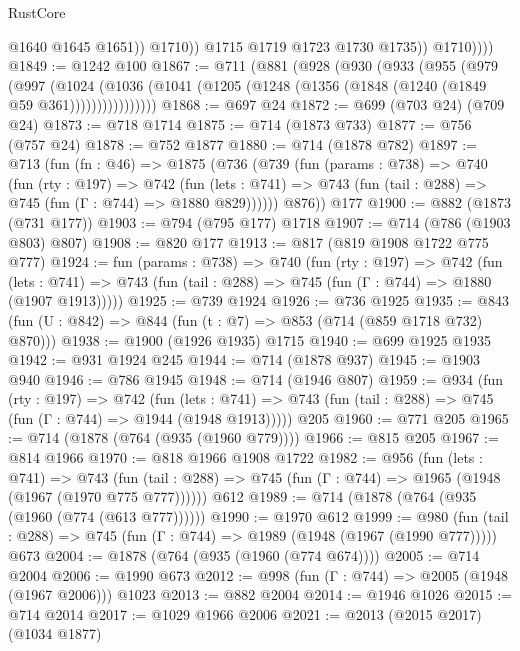 \begin{lexlean}{RustCore}
\begin{coremodule}
                        @1640
                        @1645
                        @1651))
                    @1710))
                @1715
                @1719
                @1723
                @1730
                @1735))
            @1710))))
@1849 := @1242 @100
@1867 := @711
    (@881
      (@928
        (@930
          (@933
            (@955
              (@979
                (@997
                  (@1024
                    (@1036 (@1041 (@1205 (@1248 (@1356 (@1848 (@1240 (@1849 @59 @361))))))))))))))))
@1868 := @697 @24
@1872 := @699 (@703 @24) (@709 @24)
@1873 := @718 @1714
@1875 := @714 (@1873 @733)
@1877 := @756 (@757 @24)
@1878 := @752 @1877
@1880 := @714 (@1878 @782)
@1897 := @713
    (fun (fn : @46) =>
    @1875
      (@736
        (@739
          (fun (params : @738) =>
          @740
            (fun (rty : @197) =>
            @742
              (fun (lets : @741) =>
              @743 (fun (tail : @288) => @745 (fun (Γ : @744) => @1880 @829))))))
        @876))
    @177
@1900 := @882 (@1873 (@731 @177))
@1903 := @794 (@795 @177) @1718
@1907 := @714 (@786 (@1903 @803) @807)
@1908 := @820 @177
@1913 := @817 (@819 @1908 @1722 @775 @777)
@1924 := fun (params : @738) =>
  @740
    (fun (rty : @197) =>
    @742
      (fun (lets : @741) =>
      @743 (fun (tail : @288) => @745 (fun (Γ : @744) => @1880 (@1907 @1913)))))
@1925 := @739 @1924
@1926 := @736 @1925
@1935 := @843 (fun (U : @842) => @844 (fun (t : @7) => @853 (@714 (@859 @1718 @732) @870)))
@1938 := @1900 (@1926 @1935) @1715
@1940 := @699 @1925 @1935
@1942 := @931 @1924 @245
@1944 := @714 (@1878 @937)
@1945 := @1903 @940
@1946 := @786 @1945
@1948 := @714 (@1946 @807)
@1959 := @934
    (fun (rty : @197) =>
    @742
      (fun (lets : @741) =>
      @743 (fun (tail : @288) => @745 (fun (Γ : @744) => @1944 (@1948 @1913)))))
    @205
@1960 := @771 @205
@1965 := @714 (@1878 (@764 (@935 (@1960 @779))))
@1966 := @815 @205
@1967 := @814 @1966
@1970 := @818 @1966 @1908 @1722
@1982 := @956
    (fun (lets : @741) =>
    @743 (fun (tail : @288) => @745 (fun (Γ : @744) => @1965 (@1948 (@1967 (@1970 @775 @777))))))
    @612
@1989 := @714 (@1878 (@764 (@935 (@1960 (@774 (@613 @777))))))
@1990 := @1970 @612
@1999 := @980
    (fun (tail : @288) => @745 (fun (Γ : @744) => @1989 (@1948 (@1967 (@1990 @777)))))
    @673
@2004 := @1878 (@764 (@935 (@1960 (@774 @674))))
@2005 := @714 @2004
@2006 := @1990 @673
@2012 := @998 (fun (Γ : @744) => @2005 (@1948 (@1967 @2006))) @1023
@2013 := @882 @2004
@2014 := @1946 @1026
@2015 := @714 @2014
@2017 := @1029 @1966 @2006
@2021 := @2013 (@2015 @2017) (@1034 @1877)

\end{coremodule}
\end{lexlean}
